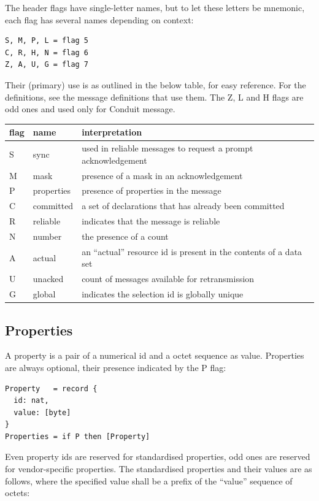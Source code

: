 \documentclass[a4paper,oneside,article]{memoir}
\begin{document}
The header flags have single-letter names, but to let these letters be mnemonic, each flag has
several names depending on context:

\begin{verbatim}
S, M, P, L = flag 5
C, R, H, N = flag 6
Z, A, U, G = flag 7  
\end{verbatim}  

Their (primary) use is as outlined in the below table, for easy reference.  For the definitions, see
the message definitions that use them.  The Z, L and H flags are odd ones and used only for Conduit
message.

\begin{tabu}{llX}
  flag & name       & interpretation \\ \hline
  S    & sync       & used in reliable messages to request a prompt acknowledgement \\
  M    & mask       & presence of a mask in an acknowledgement \\
  P    & properties & presence of properties in the message \\
  C    & committed  & a set of declarations that has already been committed \\
  R    & reliable   & indicates that the message is reliable \\
  N    & number     & the presence of a count \\
  A    & actual     & an ``actual'' resource id is present in the contents of a data set \\
  U    & unacked    & count of messages available for retransmission \\
  G    & global     & indicates the selection id is globally unique \\
\end{tabu}

\subsection{Properties}

A property is a pair of a numerical id and a octet sequence as value.  Properties are always
optional, their presence indicated by the P flag:
\begin{verbatim}
Property   = record {
  id: nat,
  value: [byte]
}
Properties = if P then [Property]  
\end{verbatim}

Even property ids are reserved for standardised properties, odd ones are reserved for
vendor-specific properties.  The standardised properties and their values are as follows, where the
specified value shall be a prefix of the ``value'' sequence of octets:
\end{document}
